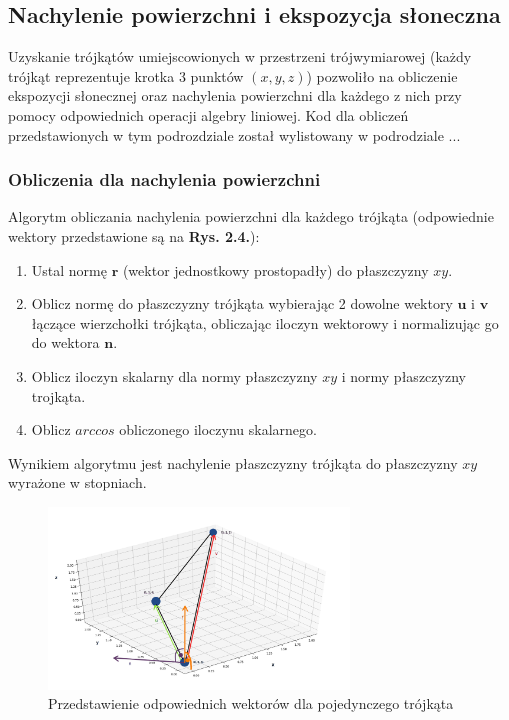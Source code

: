 \subsection{Nachylenie powierzchni i ekspozycja słoneczna}
Uzyskanie trójkątów umiejscowionych w przestrzeni trójwymiarowej (każdy trójkąt reprezentuje krotka 3 punktów $(x, y, z)$) pozwoliło na obliczenie ekspozycji słonecznej oraz nachylenia powierzchni dla każdego z nich przy pomocy odpowiednich operacji algebry liniowej. Kod dla obliczeń przedstawionych w tym podrozdziale został wylistowany w podrodziale ...

\clearpage 

\subsubsection{Obliczenia dla nachylenia powierzchni}
Algorytm obliczania nachylenia powierzchni dla każdego trójkąta (odpowiednie wektory przedstawione są na \textbf{Rys. 2.4.}):

\begin{enumerate}
\item Ustal normę $\boldsymbol{r}$ (wektor jednostkowy prostopadły) do płaszczyzny $xy$. 
\item Oblicz normę do płaszczyzny trójkąta wybierając 2 dowolne wektory $\boldsymbol{u}$ i $\boldsymbol{v}$ łączące wierzchołki trójkąta, obliczając iloczyn wektorowy i normalizując go do wektora $\boldsymbol{n}$.
\item Oblicz iloczyn skalarny dla normy płaszczyzny $xy$ i normy płaszczyzny trojkąta.
\item Oblicz $arccos$ obliczonego iloczynu skalarnego.
\end{enumerate} 

Wynikiem algorytmu jest nachylenie płaszczyzny trójkąta do płaszczyzny $xy$ wyrażone w stopniach.

\begin{figure}[h]
	\includegraphics[width=8cm]{vectors}
	\centering
	\caption{Przedstawienie odpowiednich wektorów dla pojedynczego trójkąta}
\end{figure}

